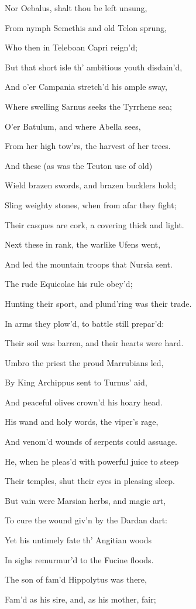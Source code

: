 Nor Oebalus, shalt thou be left unsung,

From nymph Semethis and old Telon sprung,

Who then in Teleboan Capri reign’d;

But that short isle th’ ambitious youth disdain’d,

And o’er Campania stretch’d his ample sway,

Where swelling Sarnus seeks the Tyrrhene sea;

O’er Batulum, and where Abella sees,

From her high tow’rs, the harvest of her trees.

And these (as was the Teuton use of old)

Wield brazen swords, and brazen bucklers hold;

Sling weighty stones, when from afar they fight;

Their casques are cork, a covering thick and light.

Next these in rank, the warlike Ufens went,

And led the mountain troops that Nursia sent.

The rude Equicolae his rule obey’d;

Hunting their sport, and plund’ring was their trade.

In arms they plow’d, to battle still prepar’d:

Their soil was barren, and their hearts were hard.

Umbro the priest the proud Marrubians led,

By King Archippus sent to Turnus’ aid,

And peaceful olives crown’d his hoary head.

His wand and holy words, the viper’s rage,

And venom’d wounds of serpents could assuage.

He, when he pleas’d with powerful juice to steep

Their temples, shut their eyes in pleasing sleep.

But vain were Marsian herbs, and magic art,

To cure the wound giv’n by the Dardan dart:

Yet his untimely fate th’ Angitian woods

In sighs remurmur’d to the Fucine floods.

The son of fam’d Hippolytus was there,

Fam’d as his sire, and, as his mother, fair;

